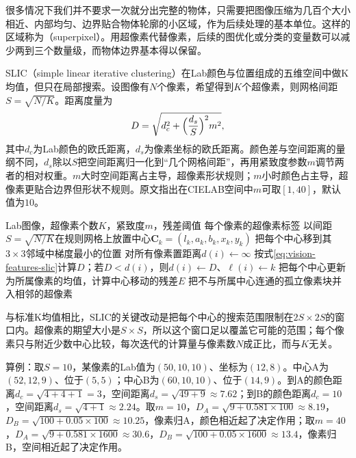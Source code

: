 很多情况下我们并不要求一次就分出完整的物体，只需要把图像压缩为几百个大小相近、内部均匀、边界贴合物体轮廓的小区域，作为后续处理的基本单位。这样的区域称为（superpixel）。用超像素代替像素，后续的图优化或分类的变量数可以减少两到三个数量级，而物体边界基本得以保留。

SLIC（simple linear iterative clustering）在Lab颜色与位置组成的五维空间中做K均值，但只在局部搜索。设图像有$N$个像素，希望得到$K$个超像素，则网格间距$S=\sqrt{N/K}$。距离度量为
\begin{equation}
  D=\sqrt{d_c^2+\Bigl(\frac{d_s}{S}\Bigr)^2m^2},
  \label{eq:vision-features-slic}
\end{equation}
其中$d_c$为Lab颜色的欧氏距离，$d_s$为像素坐标的欧氏距离。颜色差与空间距离的量纲不同，$d_s$除以$S$把空间距离归一化到“几个网格间距”，再用紧致度参数$m$调节两者的相对权重。$m$大时空间距离占主导，超像素形状规则；$m$小时颜色占主导，超像素更贴合边界但形状不规则。原文指出在CIELAB空间中$m$可取$[1,40]$，默认值为$10$。

\begin{algorithm}[SLIC超像素]
  \label{alg:vision-features-slic}
  \begin{algorithmic}[1]
    \Require Lab图像，超像素个数$K$，紧致度$m$，残差阈值
    \Ensure 每个像素的超像素标签
    \State 以间距$S=\sqrt{N/K}$在规则网格上放置中心$\bm C_k=(l_k,a_k,b_k,x_k,y_k)$
    \State 把每个中心移到其$3\times3$邻域中梯度最小的位置 
    \Repeat
      \State 对所有像素置距离$d(i)\gets\infty$
          \State 按式\eqref{eq:vision-features-slic}计算$D$；若$D<d(i)$，则$d(i)\gets D$、$\ell(i)\gets k$
        \EndFor
      \EndFor
      \State 把每个中心更新为所属像素的均值，计算中心移动的残差$E$
    \State 把不与所属中心连通的孤立像素块并入相邻的超像素
  \end{algorithmic}
\end{algorithm}

与标准K均值相比，SLIC的关键改动是把每个中心的搜索范围限制在$2S\times2S$的窗口内。超像素的期望大小是$S\times S$，所以这个窗口足以覆盖它可能的范围；每个像素只与附近少数中心比较，每次迭代的计算量与像素数$N$成正比，而与$K$无关。

算例：取$S=10$，某像素的Lab值为$(50,10,10)$、坐标为$(12,8)$。中心A为$(52,12,9)$、位于$(5,5)$；中心B为$(60,10,10)$、位于$(14,9)$。到A的颜色距离$d_c=\sqrt{4+4+1}=3$，空间距离$d_s=\sqrt{49+9}\approx7.62$；到B的颜色距离$d_c=10$，空间距离$d_s=\sqrt{4+1}\approx2.24$。取$m=10$，$D_A=\sqrt{9+0.581\times100}\approx8.19$，$D_B=\sqrt{100+0.05\times100}\approx10.25$，像素归A，颜色相近起了决定作用；取$m=40$，$D_A=\sqrt{9+0.581\times1600}\approx30.6$，$D_B=\sqrt{100+0.05\times1600}\approx13.4$，像素归B，空间相近起了决定作用。

